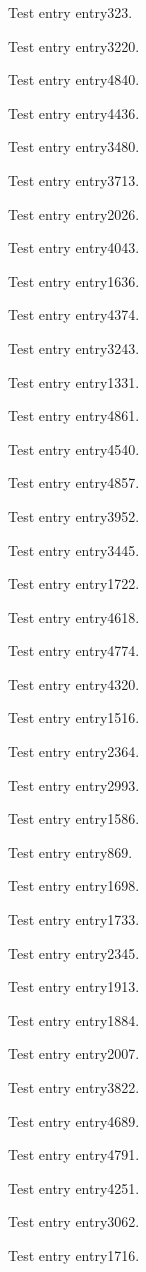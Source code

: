 Test entry \gls{entry323}.

Test entry \gls{entry3220}.

Test entry \gls{entry4840}.

Test entry \gls{entry4436}.

Test entry \gls{entry3480}.

Test entry \gls{entry3713}.

Test entry \gls{entry2026}.

Test entry \gls{entry4043}.

Test entry \gls{entry1636}.

Test entry \gls{entry4374}.

Test entry \gls{entry3243}.

Test entry \gls{entry1331}.

Test entry \gls{entry4861}.

Test entry \gls{entry4540}.

Test entry \gls{entry4857}.

Test entry \gls{entry3952}.

Test entry \gls{entry3445}.

Test entry \gls{entry1722}.

Test entry \gls{entry4618}.

Test entry \gls{entry4774}.

Test entry \gls{entry4320}.

Test entry \gls{entry1516}.

Test entry \gls{entry2364}.

Test entry \gls{entry2993}.

Test entry \gls{entry1586}.

Test entry \gls{entry869}.

Test entry \gls{entry1698}.

Test entry \gls{entry1733}.

Test entry \gls{entry2345}.

Test entry \gls{entry1913}.

Test entry \gls{entry1884}.

Test entry \gls{entry2007}.

Test entry \gls{entry3822}.

Test entry \gls{entry4689}.

Test entry \gls{entry4791}.

Test entry \gls{entry4251}.

Test entry \gls{entry3062}.

Test entry \gls{entry1716}.

